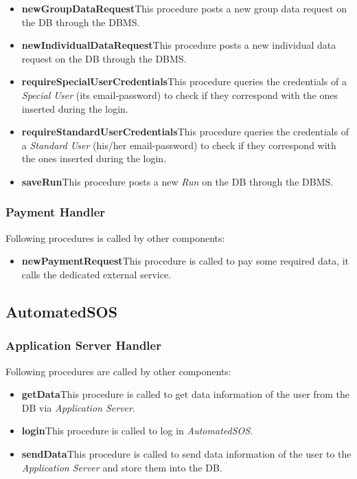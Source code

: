 \begin{itemize}
  \item \textbf{newGroupDataRequest}\quad This procedure posts a new group data request on the DB through the DBMS.
  \item \textbf{newIndividualDataRequest}\quad This procedure posts a new individual data request on the DB through the DBMS.
  \item \textbf{requireSpecialUserCredentials}\quad This procedure queries the credentials of a \textit{Special User} (its email-password) to check if they correspond with the ones inserted during the login.
  \item \textbf{requireStandardUserCredentials}\quad This procedure queries the credentials of a \textit{Standard User} (his/her email-password) to check if they correspond with the ones inserted during the login.
  \item \textbf{saveRun}\quad This procedure posts a new \textit{Run} on the DB through the DBMS.
\end{itemize}

\subsubsection{Payment Handler}
Following procedures is called by other components:
\begin{itemize}
  \item \textbf{newPaymentRequest}\quad This procedure is called to pay some required data, it calls the dedicated external service.
\end{itemize}

\subsection{AutomatedSOS}
\subsubsection{Application Server Handler}
Following procedures are called by other components:
\begin{itemize}
  \item \textbf{getData}\quad This procedure is called to get data information of the user from the DB via \textit{Application Server}.
  \item \textbf{login}\quad This procedure is called to log in \textit{AutomatedSOS}.
  \item \textbf{sendData}\quad This procedure is called to send data information of the user to the \textit{Application Server} and store them into the DB.
\end{itemize}


